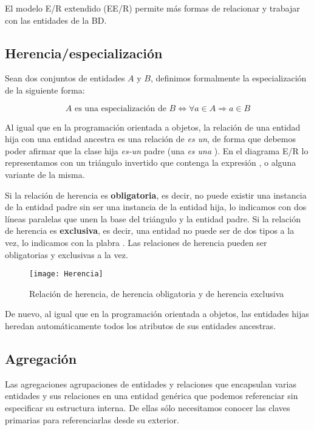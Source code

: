 El modelo E/R extendido (EE/R) permite más formas de relacionar y trabajar con las entidades de la BD\@.

\subsection{Herencia/especialización}

Sean dos conjuntos de entidades $A$ y $B$, definimos formalmente la especialización de la siguiente forma:

\[A\text{ es una especialización de }B\Leftrightarrow\forall a\in A\Rightarrow a\in B\]

Al igual que en la programación orientada a objetos, la relación de una entidad hija con una entidad ancestra es una relación de \textit{es un}, de forma que debemos poder afirmar que la clase hija \textit{es-un} padre (una  \textit{es una} ).
En el diagrama E/R lo representamos con un triángulo invertido que contenga la expresión ,  o alguna variante de la misma.

Si la relación de herencia es \textbf{obligatoria}, es decir, no puede existir una instancia de la entidad padre sin ser una instancia de la entidad hija, lo indicamos con dos líneas paralelas que unen la base del triángulo y la entidad padre.
Si la relación de herencia es \textbf{exclusiva}, es decir, una entidad no puede ser de dos tipos a la vez, lo indicamos con la plabra .
Las relaciones de herencia pueden ser obligatorias y exclusivas a la vez.

\begin{figure}[h]
\begin{center}
	\texttt{[image: Herencia]}
\end{center}
\caption{Relación de herencia, de herencia obligatoria y de herencia exclusiva}
\end{figure}

De nuevo, al igual que en la programación orientada a objetos, las entidades hijas heredan automáticamente todos los atributos de sus entidades ancestras.

\subsection{Agregación}

Las agregaciones agrupaciones de entidades y relaciones que encapsulan varias entidades y sus relaciones en una entidad genérica que podemos referenciar sin especificar su estructura interna.
De ellas sólo necesitamos conocer las claves primarias para referenciarlas desde su exterior.

